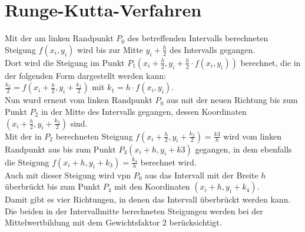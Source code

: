 \documentclass[fontset=ubuntu,12pt,a4paper]{scrreprt}
\begin{document}
\section{Runge-Kutta-Verfahren}
Mit der am linken Randpunkt \(P_0\) des betreffenden Intervalls berechneten Steigung \(f(x_i,y_i)\) wird bis zur Mitte \(y_i+\frac{h}{2}\) des Intervalls gegangen. \\
Dort wird die Steigung im Punkt \(P_1(x_i+\frac{h}{2}, y_i+\frac{h}{2}\cdot f(x_i,y_i))\) berechnet, die in der folgenden Form dargestellt werden kann: \\
\(\frac{k_2}{2}=f(x_i+\frac{h}{2}, y_i+\frac{k_1}{2})\) mit \(k_1=h\cdot f(x_i,y_i)\). \\
Nun wurd erneut vom linken Randpunkt \(P_0\) aus mit der neuen Richtung bis zum Punkt \(P_2\) in der Mitte des Intervalls gegangen, dessen Koordinaten \((x_i+\frac{h}{2},y_i+\frac{k_2}{2})\) sind. \\ Mit der in \(P_2\) berechneten Steigung \(f(x_i+\frac{h}{2},y_i+\frac{k_2}{2})=\frac{k3}{h}\) wird vom linken Randpunkt aus bis zum Punkt \(P_3(x_i+h,y_i+k3)\) gegangen, in dem ebenfalls die Steigung \(f(x_i+h,y_i+k_3)=\frac{k_4}{h}\) berechnet wird. \\ Auch mit dieser Steigung wird vpn $P_0$ aus das Intervall mit der Breite $h$ überbrückt bis zum Punkt $P_4$ mit den Koordinaten $(x_i+h,y_i+k_4)$. \\ Damit gibt es vier Richtungen, in denen das Intervall überbrückt werden kann. Die beiden in der Intervallmitte berechneten Steigungen werden bei der Mittelwertbildung mit dem Gewichtsfaktor $2$ berücksichtigt. \\ 

\vspace{2.5em}
        
\end{document}

